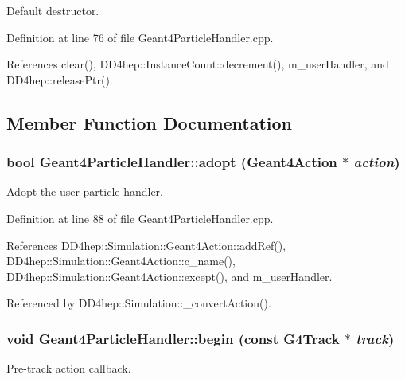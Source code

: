 Default destructor. 

Definition at line 76 of file Geant4ParticleHandler.cpp.

References clear(), DD4hep::InstanceCount::decrement(), m\_\-userHandler, and DD4hep::releasePtr().

\subsection{Member Function Documentation}
\hypertarget{class_d_d4hep_1_1_simulation_1_1_geant4_particle_handler_a2f69aadfffab73e1fb98f5cd3a1e3ebb}{
\subsubsection[{adopt}]{\setlength{\rightskip}{0pt plus 5cm}bool Geant4ParticleHandler::adopt ({\bf Geant4Action} $\ast$ {\em action})}}
\label{class_d_d4hep_1_1_simulation_1_1_geant4_particle_handler_a2f69aadfffab73e1fb98f5cd3a1e3ebb}


Adopt the user particle handler. 

Definition at line 88 of file Geant4ParticleHandler.cpp.

References DD4hep::Simulation::Geant4Action::addRef(), DD4hep::Simulation::Geant4Action::c\_\-name(), DD4hep::Simulation::Geant4Action::except(), and m\_\-userHandler.

Referenced by DD4hep::Simulation::\_\-convertAction().\hypertarget{class_d_d4hep_1_1_simulation_1_1_geant4_particle_handler_af967feef838b477f95b5fdd8dd828489}{
\subsubsection[{begin}]{\setlength{\rightskip}{0pt plus 5cm}void Geant4ParticleHandler::begin (const G4Track $\ast$ {\em track})}}
\label{class_d_d4hep_1_1_simulation_1_1_geant4_particle_handler_af967feef838b477f95b5fdd8dd828489}


Pre-\/track action callback. 

